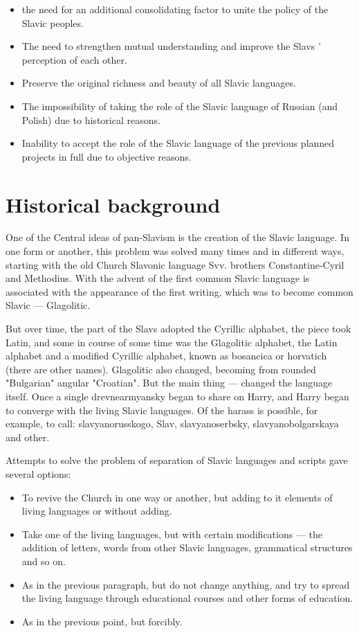 \begin{itemize}
	\item the need for an additional consolidating factor to unite the policy of the Slavic peoples.
	\item The need to strengthen mutual understanding and improve the Slavs ' perception of each other.
	\item Preserve the original richness and beauty of all Slavic languages.
	\item The impossibility of taking the role of the Slavic language of Russian (and Polish) due to historical reasons.
	\item Inability to accept the role of the Slavic language of the previous planned projects in full due to objective reasons.
\end{itemize}

\section{Historical background}

One of the Central ideas of pan-Slavism is the creation of the Slavic language. In one form or another, this problem was solved many times and in different ways, starting with the old Church Slavonic language Svv. brothers Constantine-Cyril and Methodius. With the advent of the first common Slavic language is associated with the appearance of the first writing, which was to become common Slavic — Glagolitic.

But over time, the part of the Slavs adopted the Cyrillic alphabet, the piece took Latin, and some in course of some time was the Glagolitic alphabet, the Latin alphabet and a modified Cyrillic alphabet, known as bosancica or horvatich (there are other names). Glagolitic also changed, becoming from rounded "Bulgarian" angular "Croatian". But the main thing — changed the language itself. Once a single drevnearmyansky began to share on Harry, and Harry began to converge with the living Slavic languages. Of the harass is possible, for example, to call: slavyanorusskogo, Slav, slavyanoserbsky, slavyanobolgarskaya and other.

Attempts to solve the problem of separation of Slavic languages and scripts gave several options:

\begin{itemize}
	\item To revive the Church in one way or another, but adding to it elements of living languages or without adding.
	\item Take one of the living languages, but with certain modifications — the addition of letters, words from other Slavic languages, grammatical structures and so on.
	\item As in the previous paragraph, but do not change anything, and try to spread the living language through educational courses and other forms of education.
	\item As in the previous point, but forcibly.
\end{itemize}

